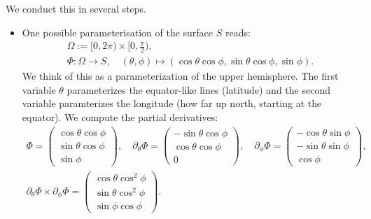 \documentclass[11pt]{article}
\begin{document}
\begin{solution}     
    We conduct this in several steps.
    \begin{itemize}
    \item 
    One possible parameterisation of the surface $S$ reads:
    \begin{gather*}
        \Omega := [0,2\pi)\times[0,\tfrac{\pi}{2}),
        \\
        \Phi: \Omega \rightarrow S, \quad (\theta,\phi)\mapsto
        (
            \cos\theta\cos\phi,
            \sin\theta\cos\phi,
            \sin\phi
        )
        .
    \end{gather*}
    We think of this as a parameterization of the upper hemisphere. 
    The first variable $\theta$ parameterizes the equator-like lines (latitude) and the second variable paramterizes the longitude (how far up north, starting at the equator).
    We compute the partial derivatives:
    \begin{gather*}
        \Phi
        =
        \begin{pmatrix}
            \cos\theta\cos\phi
            \\
            \sin\theta\cos\phi
            \\
            \sin\phi
        \end{pmatrix} 
        ,
        \quad
        \partial_{\theta} \Phi
        =
        \begin{pmatrix}
            -\sin \theta \cos \phi
            \\
             \cos \theta \cos \phi
            \\
            0
        \end{pmatrix} 
        ,
        \quad 
        \partial_{\phi} \Phi
        =
        \begin{pmatrix}
            - \cos\theta \sin\phi
            \\
            - \sin\theta \sin\phi
            \\
            \cos\phi
        \end{pmatrix} 
        ,
        \\
        \partial_{\theta} \Phi \times \partial_{\phi} \Phi
        =
        \begin{pmatrix}
            \cos\theta \cos^2\phi
            \\
            \sin\theta \cos^2\phi
            \\
            \sin\phi \cos\phi
        \end{pmatrix} 
        .

\end{gather*}
\end{itemize}
\end{solution}
\end{document}
